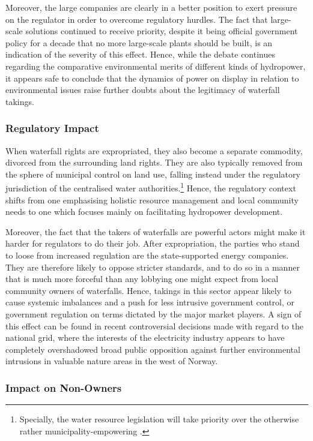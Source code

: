 Moreover, the large companies are clearly in a better position to exert pressure on the regulator in order to overcome regulatory hurdles. The fact that large-scale solutions continued to receive priority, despite it being official government policy for a decade that no more large-scale plants should be built, is an indication of the severity of this effect. Hence, while the debate continues regarding the comparative environmental merits of different kinds of hydropower, it appears safe to conclude that the dynamics of power on display in relation to environmental issues raise further doubts about the legitimacy of waterfall takings.

\subsubsection{Regulatory Impact}\label{sec:5:7:7}

When waterfall rights are expropriated, they also become a separate commodity, divorced from the surrounding land rights. They are also typically removed from the sphere of municipal control on land use, falling instead under the regulatory jurisdiction of the centralised water authorities.\footnote{Specially, the water resource legislation will take priority over the otherwise rather municipality-empowering \cite{pb08}.} Hence, the regulatory context shifts from one emphasising holistic resource management and local community needs to one which focuses mainly on facilitating hydropower development.

Moreover, the fact that the takers of waterfalls are powerful actors might make it harder for regulators to do their job. After expropriation, the parties who stand to loose from increased regulation are the state-supported energy companies. They are therefore likely to oppose stricter standards, and to do so in a manner that is much more forceful than any lobbying one might expect from local community owners of waterfalls. Hence, takings in this sector appear likely to cause systemic imbalances and a push for less intrusive government control, or government regulation on terms dictated by the major market players. A sign of this effect can be found in recent controversial decisions made with regard to the national grid, where the interests of the electricity industry appears to have completely overshadowed broad public opposition against further environmental intrusions in valuable nature areas in the west of Norway.

\subsubsection{Impact on Non-Owners}\label{sec:5:7:8}

